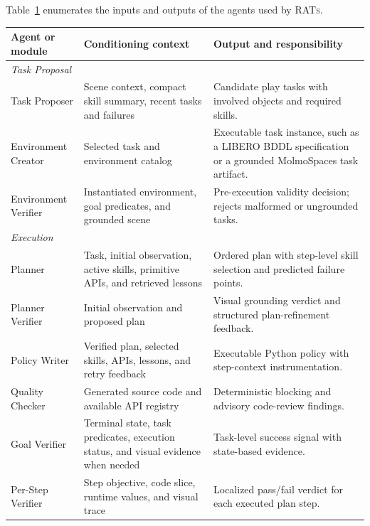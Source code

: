 \documentclass{llmxive}
\begin{document}
Table~\ref{tab:agent_prompt_contracts} enumerates the inputs and outputs of the
agents used by \textsc{RATs}. 
\begin{table}[t]
\centering
\small
\vspace{1.5em}
\label{tab:agent_prompt_contracts}
\begin{tabular}{p{} p{} p{}}
\toprule
\textbf{Agent or module} & \textbf{Conditioning context} & \textbf{Output and responsibility} \\
\midrule
\multicolumn{3}{l}{\textit{Task Proposal}} \\
\midrule
Task Proposer &
Scene context, compact skill summary, recent tasks and failures &
Candidate play tasks with involved objects and required skills. \\

Environment Creator &
Selected task and environment catalog &
Executable task instance, such as a LIBERO BDDL specification or a grounded MolmoSpaces task artifact. \\

Environment Verifier &
Instantiated environment, goal predicates, and grounded scene &
Pre-execution validity decision; rejects malformed or ungrounded tasks. \\

\midrule
\multicolumn{3}{l}{\textit{Execution}} \\
\midrule
Planner &
Task, initial observation, active skills, primitive APIs, and retrieved lessons &
Ordered plan with step-level skill selection and predicted failure points. \\

Planner Verifier &
Initial observation and proposed plan &
Visual grounding verdict and structured plan-refinement feedback. \\

Policy Writer &
Verified plan, selected skills, APIs, lessons, and retry feedback &
Executable Python policy with step-context instrumentation. \\

Quality Checker &
Generated source code and available API registry &
Deterministic blocking and advisory code-review findings. \\

Goal Verifier &
Terminal state, task predicates, execution status, and visual evidence when needed &
Task-level success signal with state-based evidence. \\

Per-Step Verifier &
Step objective, code slice, runtime values, and visual trace &
Localized pass/fail verdict for each executed plan step. \\


\end{tabular}
\end{table}
\end{document}
